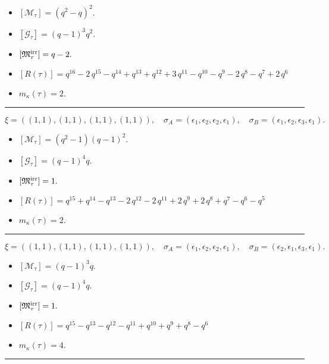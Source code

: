 \documentclass[10pt,a4paper]{amsart}
\begin{document}
\begin{itemize}
 \item $[\mathcal{M}_{\tau}] = {\left(q^{2} - q\right)}^{2} .$

 \item $[\mathcal{G}_{\tau}] = {\left(q - 1\right)}^{3} q^{2} .$

 \item $[{\frak M}_{\tau}^{\textrm{irr}}] = q - 2 .$

 \item $[R(\tau)] = q^{16} - 2 \, q^{15} - q^{14} + q^{13} + q^{12} + 3 \, q^{11} - q^{10} - q^{9} - 2 \, q^{8} - q^{7} + 2 \, q^{6} $

 \item $m_{\kappa}(\tau) = 2 .$

 \end{itemize}
\noindent\rule{8cm}{0.4pt}

$$\xi = ({(1, 1)}, {(1, 1), (1, 1)}, {(1, 1)}),\quad \sigma_A = ({{\epsilon_1}}, {{\epsilon_2}, {\epsilon_2}}, {{\epsilon_1}}),\quad \sigma_B = ({{\epsilon_1}}, {{\epsilon_2}, {\epsilon_3}}, {{\epsilon_1}}).$$

\begin{itemize}
 \item $[\mathcal{M}_{\tau}] = {\left(q^{2} - 1\right)} {\left(q - 1\right)}^{2} .$

 \item $[\mathcal{G}_{\tau}] = {\left(q - 1\right)}^{4} q .$

 \item $[{\frak M}_{\tau}^{\textrm{irr}}] = 1 .$

 \item $[R(\tau)] = q^{15} + q^{14} - q^{13} - 2 \, q^{12} - 2 \, q^{11} + 2 \, q^{9} + 2 \, q^{8} + q^{7} - q^{6} - q^{5} $

 \item $m_{\kappa}(\tau) = 2 .$

 \end{itemize}
\noindent\rule{8cm}{0.4pt}

$$\xi = ({(1, 1)}, {(1, 1), (1, 1)}, {(1, 1)}),\quad \sigma_A = ({{\epsilon_1}}, {{\epsilon_2}, {\epsilon_2}}, {{\epsilon_1}}),\quad \sigma_B = ({{\epsilon_2}}, {{\epsilon_1}, {\epsilon_3}}, {{\epsilon_1}}).$$

\begin{itemize}
 \item $[\mathcal{M}_{\tau}] = {\left(q - 1\right)}^{3} q .$

 \item $[\mathcal{G}_{\tau}] = {\left(q - 1\right)}^{4} q .$

 \item $[{\frak M}_{\tau}^{\textrm{irr}}] = 1 .$

 \item $[R(\tau)] = q^{15} - q^{13} - q^{12} - q^{11} + q^{10} + q^{9} + q^{8} - q^{6} $

 \item $m_{\kappa}(\tau) = 4 .$

 \end{itemize}
\noindent\rule{8cm}{0.4pt}
\end{document}
